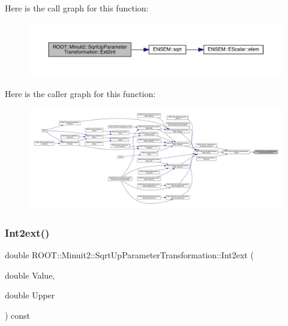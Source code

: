 Here is the call graph for this function\+:
\nopagebreak
\begin{figure}[H]
\begin{center}
\leavevmode
\includegraphics[width=350pt]{d4/d77/classROOT_1_1Minuit2_1_1SqrtUpParameterTransformation_a8ba129e1707b752df2b477c5e8459958_cgraph}
\end{center}
\end{figure}
Here is the caller graph for this function\+:
\nopagebreak
\begin{figure}[H]
\begin{center}
\leavevmode
\includegraphics[width=350pt]{d4/d77/classROOT_1_1Minuit2_1_1SqrtUpParameterTransformation_a8ba129e1707b752df2b477c5e8459958_icgraph}
\end{center}
\end{figure}
\mbox{\label{classROOT_1_1Minuit2_1_1SqrtUpParameterTransformation_afd65e37e7e03cb9db5bf9906eb399fc8}} 
\subsubsection{\texorpdfstring{Int2ext()}{Int2ext()}\hspace{0.1cm}{\footnotesize\ttfamily [1/3]}}
{\footnotesize\ttfamily double R\+O\+O\+T\+::\+Minuit2\+::\+Sqrt\+Up\+Parameter\+Transformation\+::\+Int2ext (\begin{DoxyParamCaption}\item[{double}]{Value,  }\item[{double}]{Upper }\end{DoxyParamCaption}) const}

